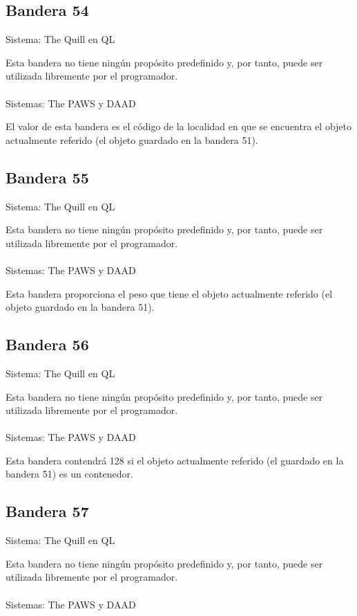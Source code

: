 \documentclass[11pt, a5paper]{article}
\newcommand{\quill}{\textsf{The Quill}\xspace}
\newcommand{\paw}{\textsf{The PAWS}\xspace}
\newcommand{\daad}{\textsf{DAAD}\xspace}
\newcommand{\sistema}[1]{\noindent Sistema: #1 \nopagebreak}
\newcommand{\sistemas}[1]{\noindent Sistemas: #1 \nopagebreak}
\begin{document}
\subsection{Bandera 54}

\sistema{\quill en QL}

Esta bandera no tiene ningún propósito predefinido y, por tanto, puede ser utilizada libremente por el programador.
\\\ \\
\sistemas{\paw y \daad}

El valor de esta bandera es el código de la localidad en que se encuentra el objeto actualmente referido (el objeto guardado en la bandera 51).

\subsection{Bandera 55}

\sistema{\quill en QL}

Esta bandera no tiene ningún propósito predefinido y, por tanto, puede ser utilizada libremente por el programador.
\\\ \\
\sistemas{\paw y \daad}

Esta bandera proporciona el peso que tiene el objeto actualmente referido (el objeto guardado en la bandera 51).

\subsection{Bandera 56}

\sistema{\quill en QL}

Esta bandera no tiene ningún propósito predefinido y, por tanto, puede ser utilizada libremente por el programador.
\\\ \\
\sistemas{\paw y \daad}

Esta bandera contendrá 128 si el objeto actualmente referido (el guardado en la bandera 51) es un contenedor.

\subsection{Bandera 57}

\sistema{\quill en QL}

Esta bandera no tiene ningún propósito predefinido y, por tanto, puede ser utilizada libremente por el programador.
\\\ \\
\sistemas{\paw y \daad}
\end{document}
